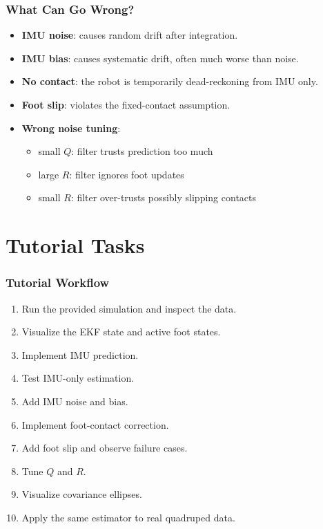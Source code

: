 \documentclass[aspectratio=169]{beamer}
\begin{document}
\begin{frame}
	\frametitle{What Can Go Wrong?}
	
	\begin{itemize}
		\item \textbf{IMU noise}: causes random drift after integration.
		
		\item \textbf{IMU bias}: causes systematic drift, often much worse than noise.
		
		\item \textbf{No contact}: the robot is temporarily dead-reckoning from IMU only.
		
		\item \textbf{Foot slip}: violates the fixed-contact assumption.
		
		\item \textbf{Wrong noise tuning}:
		\begin{itemize}
			\item small $Q$: filter trusts prediction too much
			\item large $R$: filter ignores foot updates
			\item small $R$: filter over-trusts possibly slipping contacts
		\end{itemize}
	\end{itemize}
	
\end{frame}

\section{Tutorial Tasks}
\begin{frame}
	\frametitle{Tutorial Workflow}
	
	\begin{enumerate}
		\item Run the provided simulation and inspect the data.
		\item Visualize the EKF state and active foot states.
		\item Implement IMU prediction.
		\item Test IMU-only estimation.
		\item Add IMU noise and bias.
		\item Implement foot-contact correction.
		\item Add foot slip and observe failure cases.
		\item Tune $Q$ and $R$.
		\item Visualize covariance ellipses.
		\item Apply the same estimator to real quadruped data.
	\end{enumerate}
	
\end{frame}
\end{document}
